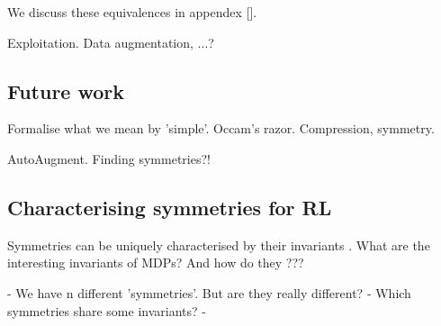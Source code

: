 We discuss these equivalences in appendex [].



Exploitation. Data augmentation, ...?


\subsection{Future work}

Formalise what we mean by 'simple'. Occam's razor. Compression, symmetry.

AutoAugment. Finding symmetries?!
\cite{Ho2019a}

\subsection{Characterising symmetries for RL}

Symmetries can be uniquely characterised by their invariants \cite{PeterOlver1999}.
What are the interesting invariants of MDPs? And how do they ???

- We have n different 'symmetries'. But are they really different?
- Which symmetries share some invariants?
-


%
